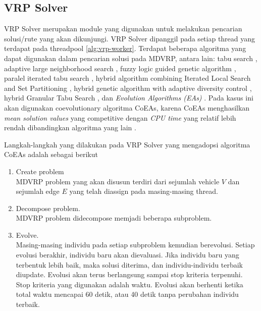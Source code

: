 \documentclass[conference]{IEEEtran}
\begin{document}
\subsection{VRP Solver}
\label{ssec:vrp-solver}
VRP Solver merupakan module yang digunakan untuk melakukan pencarian solusi/rute yang akan dikunjungi. VRP Solver dipanggil pada setiap thread yang terdapat pada threadpool \ref{alg:vrp-worker}. Terdapat beberapa algoritma yang dapat digunakan dalam pencarian solusi pada MDVRP, antara lain: tabu search \cite{cordeau_tabu_1997}, adaptive large neighborhood search  \cite{pisinger_general_2007}, fuzzy logic guided genetic algorithm \cite{lau_application_2010}, paralel iterated tabu search \cite{cordeau_parallel_2012}, hybrid algorithm combining Iterated Local Search and Set Partitioning \cite{subramanian_hybrid_2013}, hybrid genetic algorithm with adaptive diversity control \cite{vidal_implicit_2014}, hybrid Granular Tabu Search \cite{escobar_hybrid_2014}, dan \textit{Evolution Algorithms (EAs)} \cite{de_oliveira_cooperative_2016}. Pada kasus ini akan digunakan coevolutionary algoritma CoEAs, karena CoEAs menghasilkan \textit{mean solution values} yang competitive dengan \textit{CPU time} yang relatif lebih rendah dibandingkan algoritma yang lain \cite{de_oliveira_cooperative_2016}.


Langkah-langkah yang dilakukan pada VRP Solver yang mengadopsi algoritma CoEAs adalah sebagai berikut
\begin{enumerate}
\item Create problem \\
MDVRP problem yang akan disusun terdiri dari sejumlah vehicle $V$ dan sejumlah edge $E$ yang telah diassign pada masing-masing thread.
\item Decompose problem. \\
MDVRP problem didecompose memjadi beberapa subproblem.
\item Evolve. \\
Masing-masing individu pada setiap subproblem kemudian berevolusi. Setiap evolusi berakhir, individu baru akan dievaluasi. Jika individu baru yang terbentuk lebih baik, maka solusi diterima, dan individu-individu terbaik diupdate. Evolusi akan terus berlangsung sampai stop kriteria terpenuhi. Stop kriteria yang digunakan adalah waktu. Evolusi akan berhenti ketika total waktu mencapai 60 detik, atau 40 detik tanpa perubahan individu terbaik.
\end{enumerate}
\end{document}
